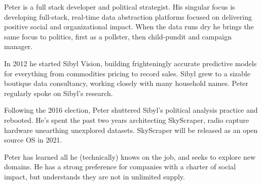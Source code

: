 
\begin{cvparagraph}
Peter is a full stack developer and political strategist. His singular focus is developing full-stack, real-time data abstraction platforms focused on delivering positive social and organizational impact. When the data runs dry he brings the same focus to politics, first as a pollster, then child-pundit and campaign manager.

In 2012 he started Sibyl Vision, building frighteningly accurate predictive models for everything from commodities pricing to record sales. Sibyl grew to a sizable boutique data consultancy, working closely with many household names. Peter regularly spoke on Sibyl’s research.

Following the 2016 election, Peter shuttered Sibyl's political analysis practice and rebooted. He's spent the past two years architecting SkyScraper, radio capture hardware unearthing unexplored datasets. SkyScraper will be released as an open source OS in 2021.
 
Peter has learned all he (technically) knows on the job, and seeks to explore new domains. He has a strong preference for companies with a charter of social impact, but understands they are not in unlimited supply.
\end{cvparagraph}
